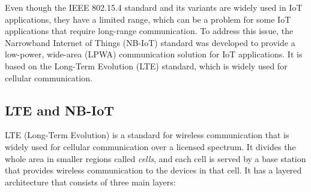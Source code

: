 Even though the IEEE 802.15.4 standard and its variants are widely used in IoT applications, they have a limited range, which can be a problem for some IoT applications that require long-range communication. To address this issue, the Narrowband Internet of Things (NB-IoT) standard was developed to provide a low-power, wide-area (LPWA) communication solution for IoT applications. It is based on the Long-Term Evolution (LTE) standard, which is widely used for cellular communication.

\subsection{LTE and NB-IoT}

LTE (Long-Term Evolution) is a standard for wireless communication that is widely used for cellular communication over a licensed spectrum. It divides the whole area in smaller regions called \emph{cells}, and each cell is served by a base station that provides wireless communication to the devices in that cell. It has a layered architecture that consists of three main layers:
